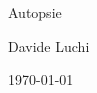\newcommand{\BookTitle}{\Huge Autopsie} %
\newcommand{\BookAuthor}{Davide Luchi} %



\begin{titlepage}
    \centering
    \vspace*{5cm} %
    {\BookTitle \par}
    \vspace{2cm}
    {\BookAuthor \par}
    \vfill
    {\small \today} %
\end{titlepage}
